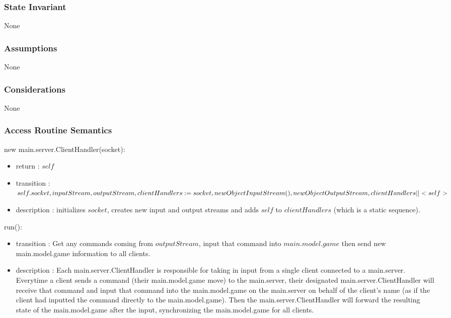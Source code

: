\documentclass[12pt, titlepage]{article}
\begin{document}
    \subsubsection* {State Invariant}
        None
    
    \subsubsection* {Assumptions}
        None
    
    \subsubsection* {Considerations}
        None
    
    \subsubsection* {Access Routine Semantics}
    
        \noindent new main.server.ClientHandler(socket):
        \begin{itemize}
        \item return : $self$
        \item transition : $self.socket, inputStream, outputStream, clientHandlers := \\
        socket, new ObjectInputStream(), new ObjectOutputStream, clientHandlers || <self>$
        \item description : initializes $socket$, creates new input and output streams and adds $self$ to $clientHandlers$ (which is a static sequence).
        \end{itemize}
        
        \noindent run():
        \begin{itemize}
        \item transition : Get any commands coming from $outputStream$, input that command into $main.model.game$ then send new main.model.game information to all clients.
        \item description : Each main.server.ClientHandler is responsible for taking in input from a single client connected to a main.server. Everytime a client sends a command (their main.model.game move) to the main.server, their designated main.server.ClientHandler will receive that command and input that command into the main.model.game on the main.server on behalf of the client's name (as if the client had inputted the command directly to the main.model.game). Then the main.server.ClientHandler will forward the resulting state of the main.model.game after the input, synchronizing the main.model.game for all clients.
        \end{itemize}
        
\end{document}

